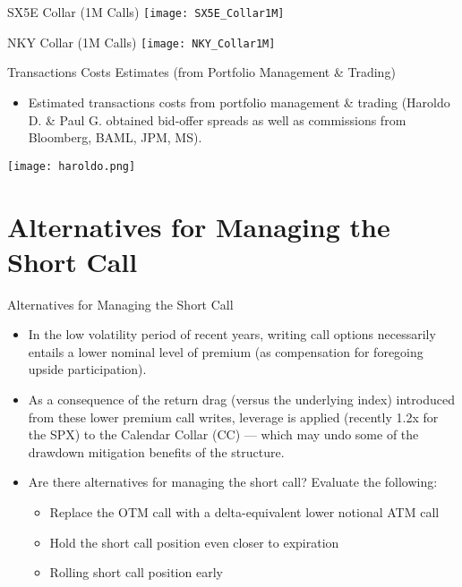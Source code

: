 \documentclass{beamer}
\begin{document}
\begin{frame}{SX5E Collar (1M Calls)}
\texttt{[image: SX5E\_Collar1M]}
\end{frame}

\begin{frame}{NKY Collar (1M Calls)}
\texttt{[image: NKY\_Collar1M]}
\end{frame}

\begin{frame}{\large Transactions Costs Estimates (from Portfolio Management \& Trading)}
\begin{itemize}
\item Estimated transactions costs from portfolio management \& trading (Haroldo D. \& Paul G. obtained bid-offer spreads as well as commissions from Bloomberg, BAML, JPM, MS).
\vfill
\end{itemize}
\texttt{[image: haroldo.png]}
\end{frame}

\section{Alternatives for Managing the Short Call}
\begin{frame}{Alternatives for Managing the Short Call}
\begin{itemize}
\item In the low volatility period of recent years, writing call options necessarily entails a lower nominal level of premium (as compensation for foregoing upside participation). 
\vfill 
\item As a consequence of the return drag (versus the underlying index) introduced from these lower premium call writes, leverage is applied (recently 1.2x for the SPX) to the Calendar Collar (CC) --- which may undo some of the drawdown mitigation benefits of the structure. 
\vfill
\item Are there alternatives for managing the short call? Evaluate the following:
\begin{itemize}
\item Replace the OTM call with a delta-equivalent lower notional ATM call
\item Hold the short call position even closer to expiration
\item Rolling short call position early
\vfill
\end{itemize}
\end{itemize}
\end{frame}
\end{document}
